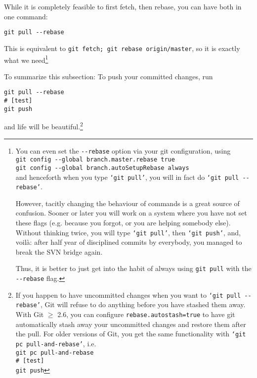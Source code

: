 \documentclass[12pt,pdftex]{article}
\begin{document}
While it is completely feasible to first fetch, then rebase, you can
have both in one command:
\lstset{frame=single,basicstyle=\ttfamily\footnotesize,language=sh,label= ,caption= ,captionpos=b,numbers=none}
\begin{lstlisting}
git pull --rebase
\end{lstlisting}
This is equivalent to \verb~git fetch; git rebase origin/master~, so it is
exactly what we need\footnote{You can even set the \texttt{-{}-rebase} option via your git configuration,
using\\
\noindent\qquad\qquad  \texttt{git config -{}-global branch.master.rebase true}\\
\noindent\qquad\qquad  \texttt{git config -{}-global branch.autoSetupRebase always}\\
and henceforth when you type \texttt{‘git pull’}, you will in fact do
\texttt{‘git pull -{}-rebase’}.

However, tacitly changing the behaviour of commands is a great source of
confusion.
Sooner or later you will work on a system where you have not set these
flags (e.g. because you forgot, or you are helping somebody else).
Without thinking twice, you will type \texttt{‘git pull’}, then \texttt{‘git push’},
and, voilà: after half year of disciplined commits by everybody, you
managed to break the SVN bridge again.

Thus, it is better to just get into the habit of always using \texttt{git pull}
with the \texttt{-{}-rebase} flag.}

\bigskip

To summarize this subsection:
To push your committed changes, run
\lstset{frame=single,basicstyle=\ttfamily\footnotesize,language=sh,label= ,caption= ,captionpos=b,numbers=none}
\begin{lstlisting}
git pull --rebase
# [test]
git push
\end{lstlisting}
and life will be beautiful.\footnote{\label{fn:autostash}If you happen to have uncommitted
changes when you want to \texttt{‘git pull -{}-rebase’}, Git will refuse to do
anything before you have stashed them away.
With Git \(\ge\) 2.6, you can configure \verb~rebase.autostash=true~ to have git
automatically stash away your uncommitted changes and restore them after
the pull.
For older versions of Git, you get the same functionality with
\texttt{‘git pc pull-and-rebase’}, i.e.\\
\noindent\qquad\qquad  \texttt{git pc pull-and-rebase}\\
\noindent\qquad\qquad  \texttt{\# [test]}\\
\noindent\qquad\qquad  \texttt{git push}}
\end{document}
